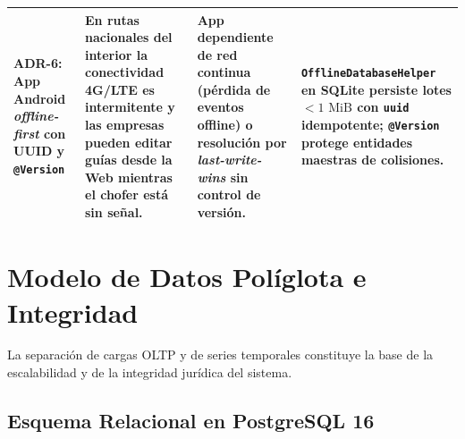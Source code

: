 \documentclass[11pt,a4paper,twocolumn]{article}
\begin{document}
\begin{table}[t]
\begin{tabularx}{\textwidth}{>{\bfseries}p{2.7cm} X X X}
\midrule
\textbf{ADR-6:} App Android \textit{offline-first} con UUID y \texttt{@Version} & En rutas nacionales del interior la conectividad 4G/LTE es intermitente y las empresas pueden editar guías desde la Web mientras el chofer está sin señal. & App dependiente de red continua (pérdida de eventos offline) o resolución por \textit{last-write-wins} sin control de versión. & \texttt{OfflineDatabaseHelper} en SQLite persiste lotes $<1\text{ MiB}$ con \texttt{uuid} idempotente; \texttt{@Version} protege entidades maestras de colisiones. \\
\bottomrule
\end{tabularx}
\end{table}

\section{Modelo de Datos Políglota e Integridad}\label{sec:datos}

La separación de cargas OLTP y de series temporales constituye la base de la escalabilidad y de la integridad jurídica del sistema.

\subsection{Esquema Relacional en PostgreSQL 16}
\end{document}
